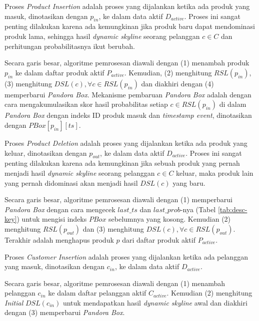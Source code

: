 
Proses \textit{Product Insertion} adalah proses yang dijalankan ketika ada produk yang masuk, dinotasikan dengan $p_{in}$, ke dalam data aktif $D_{active}$. Proses ini sangat penting dilakukan karena ada kemungkinan jika produk baru dapat mendominasi produk lama, sehingga hasil \textit{dynamic skyline} seorang pelanggan $c \in C$ dan perhitungan probabilitasnya ikut berubah.

Secara garis besar, algoritme pemrosesan diawali dengan (1) menambah produk $p_{in}$ ke dalam daftar produk aktif $P_{active}$. Kemudian, (2) menghitung $RSL(p_{in})$, (3) menghitung $DSL(c), \forall c \in RSL(p_{in})$ dan diakhiri dengan (4) memperbarui \textit{Pandora Box}. Mekanisme pembaruan \textit{Pandora Box} adalah dengan cara mengakumulasikan skor hasil probabilitas setiap $c \in RSL(p_{in})$ di dalam \textit{Pandora Box} dengan indeks ID produk masuk dan \textit{timestamp event}, dinotasikan dengan $PBox[p_{in}][ts]$.


Proses \textit{Product Deletion} adalah proses yang dijalankan ketika ada produk yang keluar, dinotasikan dengan $p_{out}$,  ke dalam data aktif $D_{active}$. Proses ini sangat penting dilakukan karena ada kemungkinan jika sebuah produk yang pernah menjadi hasil \textit{dynamic skyline} seorang pelanggan $c \in C$ keluar, maka produk lain yang pernah didominasi akan menjadi hasil $DSL(c)$ yang baru.

Secara garis besar, algoritme pemrosesan diawali dengan (1) memperbarui \textit{Pandora Box} dengan cara mengecek $last\_ts$ dan $last\_prob$-nya (Tabel \ref{tab:desc-key}) untuk mengisi indeks $PBox$ sebelumnya yang kosong. Kemudian (2) menghitung $RSL(p_{out})$ dan (3) menghitung $DSL(c), \forall c \in RSL(p_{out})$. Terakhir adalah menghapus produk $p$ dari daftar produk aktif $P_{active}$.


Proses \textit{Customer Insertion} adalah proses yang dijalankan ketika ada pelanggan yang masuk, dinotasikan dengan $c_{in}$, ke dalam data aktif $D_{active}$. 

Secara garis besar, algoritme pemrosesan diawali dengan (1) menambah pelanggan $c_{in}$ ke dalam daftar pelanggan aktif $C_{active}$. Kemudian (2) menghitung \textit{Initial} $DSL(c_{in})$ untuk mendapatkan hasil \textit{dynamic skyline} awal dan diakhiri dengan (3) memperbarui \textit{Pandora Box}.

